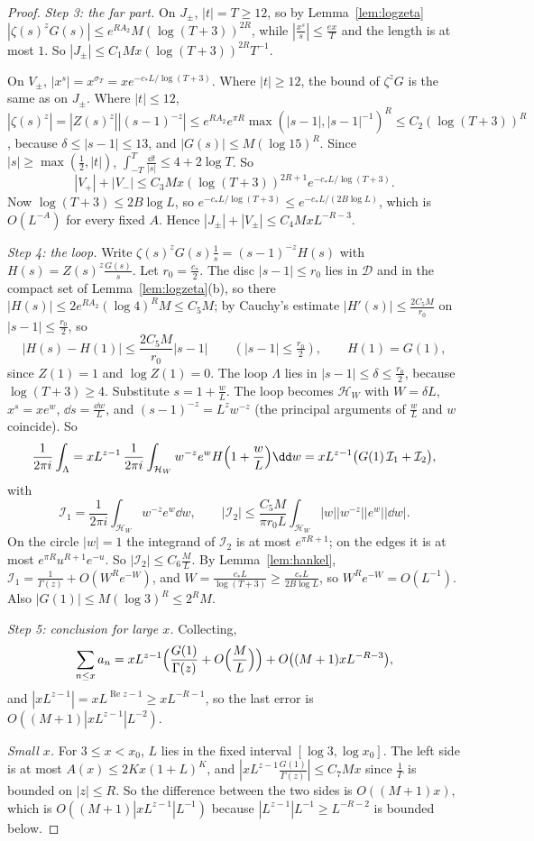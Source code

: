 \begin{proof}
\emph{Step 3: the far part.} On $J_\pm$, $|t|=T\ge12$, so by Lemma~\ref{lem:logzeta} $|\zeta(s)^zG(s)|\le e^{RA_2}M(\log(T+3))^{2R}$, while $|\frac{x^s}s|\le\frac{ex}T$ and the length is at most $1$. So $|J_\pm|\le C_1Mx(\log(T+3))^{2R}T^{-1}$.

On $V_\pm$, $|x^s|=x^{\sigma_T}=xe^{-c_*L/\log(T+3)}$. Where $|t|\ge12$, the bound of $\zeta^zG$ is the same as on $J_\pm$. Where $|t|\le12$, $|\zeta(s)^z|=|Z(s)^z||(s-1)^{-z}|\le e^{RA_2}e^{\pi R}\max(|s-1|,|s-1|^{-1})^R\le C_2(\log(T+3))^R$, because $\delta\le|s-1|\le13$, and $|G(s)|\le M(\log 15)^R$. Since $|s|\ge\max(\frac12,|t|)$, $\int_{-T}^T\frac{\dd t}{|s|}\le4+2\log T$. So
\[
|V_+|+|V_-|\le C_3Mx(\log(T+3))^{2R+1}e^{-c_*L/\log(T+3)}.
\]
Now $\log(T+3)\le2B\log L$, so $e^{-c_*L/\log(T+3)}\le e^{-c_*L/(2B\log L)}$, which is $O(L^{-A})$ for every fixed $A$. Hence $|J_\pm|+|V_\pm|\le C_4MxL^{-R-3}$.

\emph{Step 4: the loop.} Write $\zeta(s)^zG(s)\frac1s=(s-1)^{-z}H(s)$ with $H(s)=Z(s)^z\frac{G(s)}s$. Let $r_0=\frac{c_*}2$. The disc $|s-1|\le r_0$ lies in $\mathcal D$ and in the compact set of Lemma~\ref{lem:logzeta}(b), so there $|H(s)|\le2e^{RA_2}(\log 4)^RM\le C_5M$; by Cauchy's estimate $|H'(s)|\le\frac{2C_5M}{r_0}$ on $|s-1|\le\frac{r_0}2$, so
\[
|H(s)-H(1)|\le\frac{2C_5M}{r_0}|s-1|\qquad(|s-1|\le\tfrac{r_0}2),\qquad H(1)=G(1),
\]
since $Z(1)=1$ and $\log Z(1)=0$. The loop $\Lambda$ lies in $|s-1|\le\delta\le\frac{r_0}2$, because $\log(T+3)\ge4$. Substitute $s=1+\frac wL$. The loop becomes $\mathcal H_W$ with $W=\delta L$, $x^s=xe^w$, $\dd s=\frac{\dd w}L$, and $(s-1)^{-z}=L^zw^{-z}$ (the principal arguments of $\frac wL$ and $w$ coincide). So
\[
\frac1{2\pi i}\int_\Lambda=xL^{z-1}\,\frac1{2\pi i}\int_{\mathcal H_W}w^{-z}e^wH\Bigl(1+\frac wL\Bigr)\dd w=xL^{z-1}\bigl(G(1)\,\mathcal I_1+\mathcal I_2\bigr),
\]
with
\[
\mathcal I_1=\frac1{2\pi i}\int_{\mathcal H_W}w^{-z}e^w\dd w,\qquad|\mathcal I_2|\le\frac{C_5M}{\pi r_0L}\int_{\mathcal H_W}|w||w^{-z}||e^w||\dd w|.
\]
On the circle $|w|=1$ the integrand of $\mathcal I_2$ is at most $e^{\pi R+1}$; on the edges it is at most $e^{\pi R}u^{R+1}e^{-u}$. So $|\mathcal I_2|\le C_6\frac ML$. By Lemma~\ref{lem:hankel}, $\mathcal I_1=\frac1{\Gamma(z)}+O(W^Re^{-W})$, and $W=\frac{c_*L}{\log(T+3)}\ge\frac{c_*L}{2B\log L}$, so $W^Re^{-W}=O(L^{-1})$. Also $|G(1)|\le M(\log3)^R\le2^RM$.

\emph{Step 5: conclusion for large $x$.} Collecting,
\[
\sum_{n\le x}a_n=xL^{z-1}\Bigl(\frac{G(1)}{\Gamma(z)}+O\Bigl(\frac ML\Bigr)\Bigr)+O\bigl((M+1)xL^{-R-3}\bigr),
\]
and $|xL^{z-1}|=xL^{\operatorname{Re}z-1}\ge xL^{-R-1}$, so the last error is $O((M+1)|xL^{z-1}|L^{-2})$.

\emph{Small $x$.} For $3\le x<x_0$, $L$ lies in the fixed interval $[\log3,\log x_0]$. The left side is at most $A(x)\le2Kx(1+L)^K$, and $|xL^{z-1}\frac{G(1)}{\Gamma(z)}|\le C_7Mx$ since $\frac1\Gamma$ is bounded on $|z|\le R$. So the difference between the two sides is $O((M+1)x)$, which is $O((M+1)|xL^{z-1}|L^{-1})$ because $|L^{z-1}|L^{-1}\ge L^{-R-2}$ is bounded below.
\end{proof}

